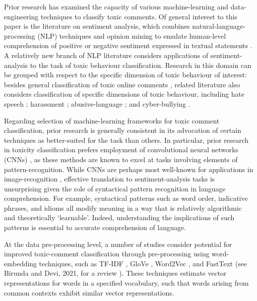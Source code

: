 
Prior research has examined the capacity of various machine-learning and data-engineering techniques to classify toxic comments. 
Of general interest to this paper is the literature on sentiment analysis, which combines natural-language-processing (NLP) techniques and opinion mining to emulate human-level comprehension of positive or negative sentiment expressed in textual statements \cite{chowdhary2020natural, cambria2014jumping}.
A relatively new branch of NLP literature considers applications of sentiment-analysis to the task of toxic behaviour classification. 
Research in this domain can be grouped with respect to the specific dimension of toxic behaviour of interest: besides general classification of toxic online comments \cite{georgakopoulos2018convolutional,van2018challenges,risch2020toxic}, related literature also considers classification of specific dimensions of toxic behaviour, including hate speech \cite{mullah2021advances, ayo2020machine, rizos2019augment, yang2019exploring}; harassment \cite{abarna2022identification, basu2021cyberpolice, marwa2018deep}; abusive-language \cite{vidgen2020directions, nobata2016abusive, bourgonje2017automatic}; and cyber-bullying \cite{kanan2020cyber, akhter2019cyber, di2016unsupervised}.

Regarding selection of machine-learning frameworks for toxic comment classification, prior research is generally consistent in its advocation of certain techniques as better-suited for the task than others. In particular, prior research in toxicity classification prefers employment of convolutional neural networks (CNNs) \cite{androcec2020machine}, as these methods are known to excel at tasks involving elements of pattern-recognition. While CNNs are perhaps most well-known for applications in image-recognition \cite{rawat2017deep}, effective translation to sentiment-analysis tasks is unsurprising given the role of syntactical pattern recognition in language comprehension. For example, syntactical patterns such as word order, indicative phrases, and idioms all modify meaning in a way that is relatively algorithmic and theoretically `learnable'. Indeed, understanding the implications of such patterns is essential to accurate comprehension of language. 

At the data pre-processing level, a number of studies consider potential for improved toxic-comment classification through pre-processing using  word-embedding techniques, such as TF-IDF \cite{saha2018hateminers, de2021profiling, badjatiya2017deep}, GloVe \cite{badjatiya2017deep, ribeiro2019inf, founta2019unified}, Word2Vec \cite{gamback2017using}, and FastText \cite{ribeiro2019inf} (see Birunda and Devi, 2021, for a review \cite{selva2021review}). 
These techniques estimate vector representations for words in a specified vocabulary, such that words arising from common contexts exhibit similar vector representations. 



